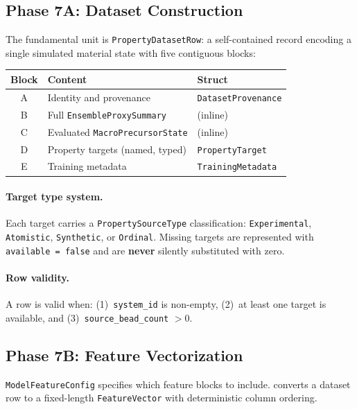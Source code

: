 \documentclass[11pt]{article}
\newcommand{\type}[1]{\texttt{#1}}
\begin{document}
\subsection{Phase 7A: Dataset Construction}

The fundamental unit is \type{PropertyDatasetRow}: a self-contained
record encoding a single simulated material state with five contiguous
blocks:

\begin{center}
\begin{tabular}{cll}
\toprule
\textbf{Block} & \textbf{Content} & \textbf{Struct} \\
\midrule
A & Identity and provenance & \type{DatasetProvenance} \\
B & Full \type{EnsembleProxySummary} & (inline) \\
C & Evaluated \type{MacroPrecursorState} & (inline) \\
D & Property targets (named, typed) & \type{PropertyTarget} \\
E & Training metadata & \type{TrainingMetadata} \\
\bottomrule
\end{tabular}
\end{center}

\paragraph{Target type system.}
Each target carries a \type{PropertySourceType} classification:
\texttt{Experimental}, \texttt{Atomistic}, \texttt{Synthetic}, or
\texttt{Ordinal}.  Missing targets are represented with
\texttt{available = false} and are \textbf{never} silently substituted
with zero.

\paragraph{Row validity.}
A row is valid when: (1)~\texttt{system\_id} is non-empty,
(2)~at least one target is available, and
(3)~\texttt{source\_bead\_count} $> 0$.

\subsection{Phase 7B: Feature Vectorization}

\type{ModelFeatureConfig} specifies which feature blocks to include.
 converts a dataset row to a fixed-length
\type{FeatureVector} with deterministic column ordering.
\end{document}
